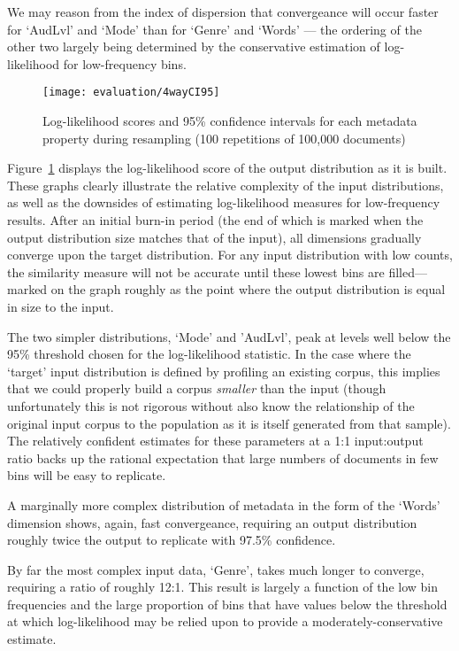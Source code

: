 We may reason from the index of dispersion that convergeance will occur faster for `AudLvl' and `Mode' than for `Genre' and `Words' --- the ordering of the other two largely being determined by the conservative estimation of log-likelihood for low-frequency bins.


\begin{figure}[Ht]
    \centering
    \texttt{[image: evaluation/4wayCI95]}
    \caption{Log-likelihood scores and 95\% confidence intervals for each metadata property during resampling (100 repetitions of 100,000 documents)}
    \label{fig:evaluation:resampling:4wayCI95}
\end{figure}


Figure~\ref{fig:evaluation:resampling:4wayCI95} displays the log-likelihood score of the output distribution as it is built.  These graphs clearly illustrate the relative complexity of the input distributions, as well as the downsides of estimating log-likelihood measures for low-frequency results.  After an initial burn-in period (the end of which is marked when the output distribution size matches that of the input), all dimensions gradually converge upon the target distribution.  For any input distribution with low counts, the similarity measure will not be accurate until these lowest bins are filled---marked on the graph roughly as the point where the output distribution is equal in size to the input.

The two simpler distributions, `Mode' and 'AudLvl', peak at levels well below the 95\% threshold chosen for the log-likelihood statistic.  In the case where the `target' input distribution is defined by profiling an existing corpus, this implies that we could properly build a corpus \textit{smaller} than the input (though unfortunately this is not rigorous without also know the relationship of the original input corpus to the population as it is itself generated from that sample).  The relatively confident estimates for these parameters at a 1:1 input:output ratio backs up the rational expectation that large numbers of documents in few bins will be easy to replicate.

A marginally more complex distribution of metadata in the form of the `Words' dimension shows, again, fast convergeance, requiring an output distribution roughly twice the output to replicate with 97.5\% confidence.

By far the most complex input data, `Genre', takes much longer to converge, requiring a ratio of roughly 12:1.  This result is largely a function of the low bin frequencies and the large proportion of bins that have values below the threshold at which log-likelihood may be relied upon to provide a moderately-conservative estimate.

